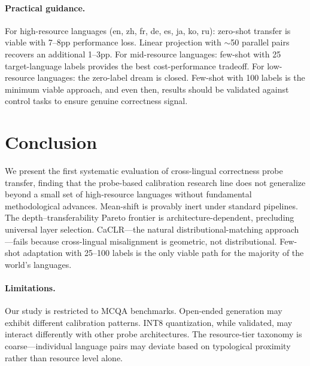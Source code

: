 \documentclass[11pt,a4paper]{article}
\begin{document}
\paragraph{Practical guidance.}
For high-resource languages (en, zh, fr, de, es, ja, ko, ru): zero-shot transfer is viable with 7--8pp performance loss. Linear projection with $\sim$50 parallel pairs recovers an additional 1--3pp. For mid-resource languages: few-shot with 25 target-language labels provides the best cost-performance tradeoff. For low-resource languages: the zero-label dream is closed. Few-shot with 100 labels is the minimum viable approach, and even then, results should be validated against control tasks to ensure genuine correctness signal.

\section{Conclusion}
\label{sec:conclusion}

We present the first systematic evaluation of cross-lingual correctness probe transfer, finding that the probe-based calibration research line does not generalize beyond a small set of high-resource languages without fundamental methodological advances. Mean-shift is provably inert under standard pipelines. The depth--transferability Pareto frontier is architecture-dependent, precluding universal layer selection. CaCLR---the natural distributional-matching approach---fails because cross-lingual misalignment is geometric, not distributional. Few-shot adaptation with 25--100 labels is the only viable path for the majority of the world's languages.

\paragraph{Limitations.}
Our study is restricted to MCQA benchmarks. Open-ended generation may exhibit different calibration patterns. INT8 quantization, while validated, may interact differently with other probe architectures. The resource-tier taxonomy is coarse---individual language pairs may deviate based on typological proximity rather than resource level alone.



\end{document}
